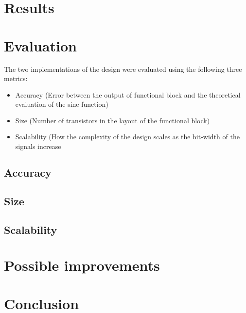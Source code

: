 \documentclass[10pt,journal]{IEEEtran}
\begin{document}
\section{Results}

\section{Evaluation}
The two implementations of the design were evaluated using the following three metrics:
\begin{itemize}
\item Accuracy (Error between the output of functional block and the theoretical evaluation of the sine function)
\item Size (Number of transistors in the layout of the functional block)
\item Scalability (How the complexity of the design scales as the bit-width of the signals increase
\end{itemize}

\subsection{Accuracy}
\subsection{Size}
\subsection{Scalability}

\section{Possible improvements}


\section{Conclusion}
\end{document}
